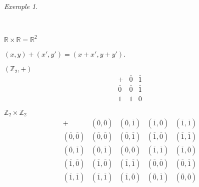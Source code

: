 \documentclass{report}
\newcommand*{\reels}{\mathbb{R}}
\newcommand*{\entiers}{\mathbb{Z}}
\theoremstyle{definition}
\theoremstyle{remark}
\newtheorem*{exem}{Exemple}
\begin{document}
	\begin{exem}
		\begin{ulist}~

			\item $\reels \times \reels = \reels^2$

			$(x,y)+(x',y')=(x+x',y+y')$.
			\item $(\entiers_2,+)$
			\renewcommand{\arraystretch}{1.5}
			\[
			\begin{array}{c||c|c}
				+&\overline0&\overline1\\
				\hline\hline
				\overline0&\overline0&\overline1\\
				\hline
				\overline1&\overline1&\overline0
			\end{array}
			\]

			$\entiers_2 \times \entiers_2$
			\[
			\begin{array}{c||c|c|c|c}
				+&(\overline0,\overline0)& (\overline0,\overline1)& (\overline1,\overline0)& (\overline1,\overline1)\\
				\hline\hline
				(\overline0,\overline0)& (\overline0,\overline0)& (\overline0,\overline1)& (\overline1,\overline0)& (\overline1,\overline1)\\
				\hline
				(\overline0,\overline1)& (\overline0,\overline1)& (\overline0,\overline0)& (\overline1,\overline1)& (\overline1,\overline0)\\
				\hline
				(\overline1,\overline0)& (\overline1,\overline0)& (\overline1,\overline1)& (\overline0,\overline0)& (\overline0,\overline1)\\
				\hline
				(\overline1,\overline1)& (\overline1,\overline1)& (\overline1,\overline0)& (\overline0,\overline1)& (\overline0,\overline0)
			\end{array}
			\]
			\renewcommand{\arraystretch}{1}
		\end{ulist}
	\end{exem}
\end{document}
